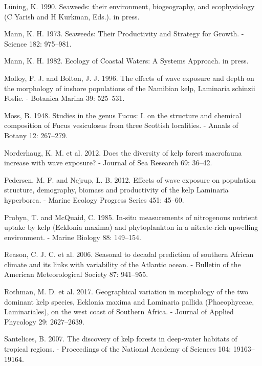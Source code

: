 \documentclass[10pt,a4,]{article}
\begin{document}
\leavevmode\hypertarget{ref-Luning1990}{}%
Lüning, K. 1990. Seaweeds: their environment, biogeography, and
ecophysiology (C Yarish and H Kurkman, Eds.). in press.

\leavevmode\hypertarget{ref-Mann1973}{}%
Mann, K. H. 1973. Seaweeds: Their Productivity and Strategy for Growth.
- Science 182: 975--981.

\leavevmode\hypertarget{ref-Mann1982}{}%
Mann, K. H. 1982. Ecology of Coastal Waters: A Systems Approach. in
press.

\leavevmode\hypertarget{ref-Molloy1996}{}%
Molloy, F. J. and Bolton, J. J. 1996. The effects of wave exposure and
depth on the morphology of inshore populations of the Namibian kelp,
Laminaria schinzii Foslie. - Botanica Marina 39: 525--531.

\leavevmode\hypertarget{ref-moss1948}{}%
Moss, B. 1948. Studies in the genus Fucus: I. on the structure and
chemical composition of Fucus vesiculosus from three Scottish
localities. - Annals of Botany 12: 267--279.

\leavevmode\hypertarget{ref-Norderhaug2012}{}%
Norderhaug, K. M. et al. 2012. Does the diversity of kelp forest
macrofauna increase with wave exposure? - Journal of Sea Research 69:
36--42.

\leavevmode\hypertarget{ref-pedersen2012a}{}%
Pedersen, M. F. and Nejrup, L. B. 2012. Effects of wave exposure on
population structure, demography, biomass and productivity of the kelp
Laminaria hyperborea. - Marine Ecology Progress Series 451: 45--60.

\leavevmode\hypertarget{ref-Probyn1985}{}%
Probyn, T. and McQuaid, C. 1985. In-situ measurements of nitrogenous
nutrient uptake by kelp (Ecklonia maxima) and phytoplankton in a
nitrate-rich upwelling environment. - Marine Biology 88: 149--154.

\leavevmode\hypertarget{ref-Reason2006}{}%
Reason, C. J. C. et al. 2006. Seasonal to decadal prediction of southern
African climate and its links with variability of the Atlantic ocean. -
Bulletin of the American Meteorological Society 87: 941--955.

\leavevmode\hypertarget{ref-Rothman2017}{}%
Rothman, M. D. et al. 2017. Geographical variation in morphology of the
two dominant kelp species, Ecklonia maxima and Laminaria pallida
(Phaeophyceae, Laminariales), on the west coast of Southern Africa. -
Journal of Applied Phycology 29: 2627--2639.

\leavevmode\hypertarget{ref-Santelices2007}{}%
Santelices, B. 2007. The discovery of kelp forests in deep-water
habitats of tropical regions. - Proceedings of the National Academy of
Sciences 104: 19163--19164.
\end{document}
